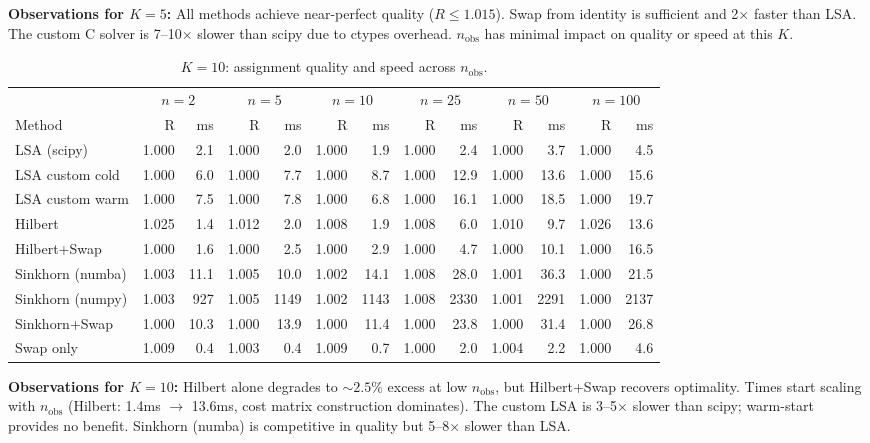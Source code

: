 \documentclass[11pt,a4paper]{article}
\begin{document}
\textbf{Observations for $K=5$:} All methods achieve near-perfect quality ($R \le 1.015$). Swap from identity is sufficient and 2$\times$ faster than LSA. The custom C solver is 7--10$\times$ slower than scipy due to ctypes overhead. $n_{\text{obs}}$ has minimal impact on quality or speed at this $K$.

\begin{table}[h!]
\centering
\caption{$K = 10$: assignment quality and speed across $n_{\text{obs}}$.}
\label{tab:K10}
\small
\begin{tabular}{l rrrrrrrrrrrr}
\toprule
& \multicolumn{2}{c}{$n=2$} & \multicolumn{2}{c}{$n=5$} & \multicolumn{2}{c}{$n=10$} & \multicolumn{2}{c}{$n=25$} & \multicolumn{2}{c}{$n=50$} & \multicolumn{2}{c}{$n=100$} \\
\cmidrule(lr){2-3}\cmidrule(lr){4-5}\cmidrule(lr){6-7}\cmidrule(lr){8-9}\cmidrule(lr){10-11}\cmidrule(lr){12-13}
Method & R & ms & R & ms & R & ms & R & ms & R & ms & R & ms \\
\midrule
LSA (scipy)         & 1.000 & 2.1 & 1.000 & 2.0 & 1.000 & 1.9 & 1.000 & 2.4 & 1.000 & 3.7 & 1.000 & 4.5 \\
LSA custom cold     & 1.000 & 6.0 & 1.000 & 7.7 & 1.000 & 8.7 & 1.000 & 12.9 & 1.000 & 13.6 & 1.000 & 15.6 \\
LSA custom warm     & 1.000 & 7.5 & 1.000 & 7.8 & 1.000 & 6.8 & 1.000 & 16.1 & 1.000 & 18.5 & 1.000 & 19.7 \\
Hilbert             & 1.025 & 1.4 & 1.012 & 2.0 & 1.008 & 1.9 & 1.008 & 6.0 & 1.010 & 9.7 & 1.026 & 13.6 \\
Hilbert+Swap        & 1.000 & 1.6 & 1.000 & 2.5 & 1.000 & 2.9 & 1.000 & 4.7 & 1.000 & 10.1 & 1.000 & 16.5 \\
Sinkhorn (numba)    & 1.003 & 11.1 & 1.005 & 10.0 & 1.002 & 14.1 & 1.008 & 28.0 & 1.001 & 36.3 & 1.000 & 21.5 \\
Sinkhorn (numpy)    & 1.003 & 927 & 1.005 & 1149 & 1.002 & 1143 & 1.008 & 2330 & 1.001 & 2291 & 1.000 & 2137 \\
Sinkhorn+Swap       & 1.000 & 10.3 & 1.000 & 13.9 & 1.000 & 11.4 & 1.000 & 23.8 & 1.000 & 31.4 & 1.000 & 26.8 \\
Swap only           & 1.009 & 0.4 & 1.003 & 0.4 & 1.009 & 0.7 & 1.000 & 2.0 & 1.004 & 2.2 & 1.000 & 4.6 \\
\bottomrule
\end{tabular}
\end{table}

\textbf{Observations for $K=10$:} Hilbert alone degrades to $\sim 2.5\%$ excess at low $n_{\text{obs}}$, but Hilbert+Swap recovers optimality. Times start scaling with $n_{\text{obs}}$ (Hilbert: 1.4ms $\to$ 13.6ms, cost matrix construction dominates). The custom LSA is 3--5$\times$ slower than scipy; warm-start provides no benefit. Sinkhorn (numba) is competitive in quality but 5--8$\times$ slower than LSA.
\end{document}
